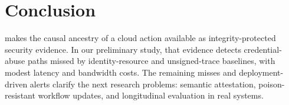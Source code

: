 \section{Conclusion}

\system{} makes the causal ancestry of a cloud action available as
integrity-protected security evidence. In our preliminary study, that evidence
detects credential-abuse paths missed by identity-resource and unsigned-trace
baselines, with modest latency and bandwidth costs. The remaining misses and
deployment-driven alerts clarify the next research problems: semantic
attestation, poison-resistant workflow updates, and longitudinal evaluation in
real systems.
